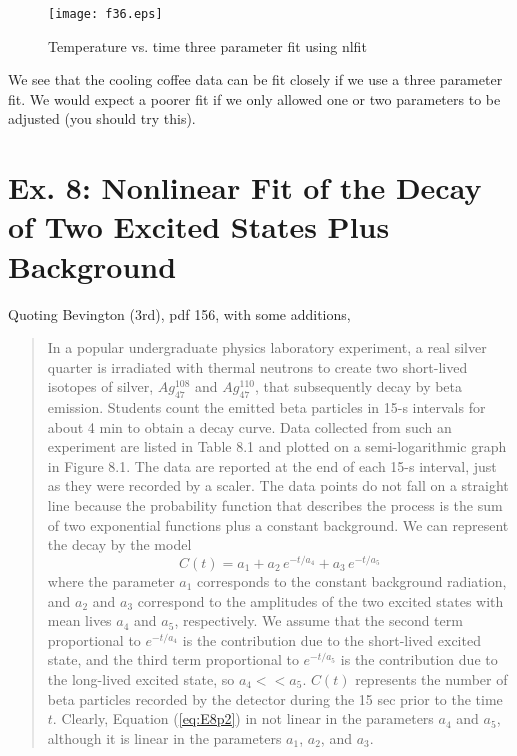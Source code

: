 \documentclass[12pt]{article}
\begin{document}
\begin{figure} [h]
   \centerline{\texttt{[image: f36.eps]} }
	\caption{ Temperature vs. time three parameter fit using nlfit }
\end{figure}    

\noindent We see that the cooling coffee data can be fit closely if we use
  a three parameter fit.
We would expect a poorer fit if we only allowed one or two parameters to be
  adjusted (you should try this).  
\section{Ex. 8: Nonlinear Fit of the Decay of Two Excited States Plus Background}   
Quoting Bevington (3rd), pdf 156, with some additions,
\begin{quote}
In a popular undergraduate physics laboratory experiment, a real silver quarter is irradiated with thermal neutrons to create two short-lived isotopes of silver, $Ag_{47}^{108}$ and $Ag_{47}^{110}$, that subsequently decay by beta emission.
Students count the emitted beta particles in 15-s intervals for about 4 min to obtain a decay curve.
Data collected from such an experiment are listed in Table 8.1 and plotted on a semi-logarithmic graph in Figure 8.1.
The data are reported at the end of each 15-s interval, just as they were recorded by a scaler.
The data points do not fall on a straight line because the probability function that describes the process is the sum of two exponential functions plus a constant background.
We can represent the decay by the model
\begin{equation}    \label{eq:E8p2}
   C(t) = a_1 + a_2\,e^{-t/a_4} + a_3\,e^{-t/a_5}
\end{equation}
   where the parameter $a_1$ corresponds to the constant background radiation, and $a_2$ and $a_3$ correspond to the amplitudes of the two excited states with mean lives $a_4$ and $a_5$, respectively.
We assume that the second term proportional to $e^{-t/a_4}$ is the contribution due to the short-lived excited state, and the third term proportional to   $e^{-t/a_5}$ is the contribution due to the long-lived excited state, so
$a_4 << a_5$. 
$C(t)$ represents the number of beta particles recorded by the detector during the 15 sec prior to the time $t$.
Clearly, Equation  (\ref{eq:E8p2})   in not linear in the parameters $a_4$ and $a_5$, although it is linear in the parameters $a_1$, $a_2$, and $a_3$.
\end{quote}
\newpage
\end{document}
